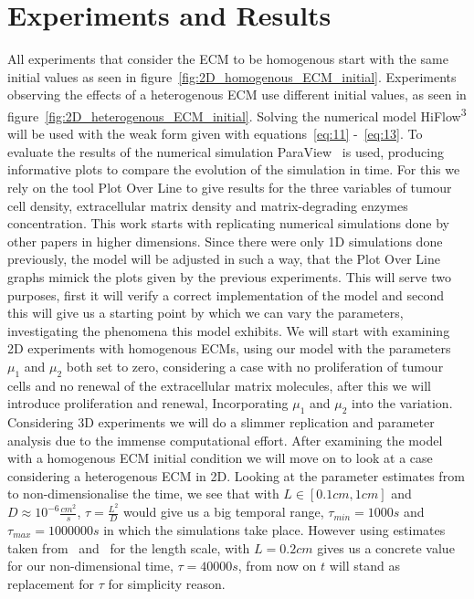 

\section{Experiments and Results}

All experiments that consider the ECM to be homogenous start with the same initial values as seen in figure~\ref{fig:2D_homogenous_ECM_initial}. Experiments observing the effects of a heterogenous ECM use different initial values, as seen in figure~\ref{fig:2D_heterogenous_ECM_initial}.\newline 
Solving the numerical model HiFlow\textsuperscript{3} will be used with the weak form given with equations~\ref{eq:11} -~\ref{eq:13}. To evaluate the results of the numerical simulation ParaView~\cite{paraview} is used, producing informative plots to compare the evolution of the simulation in time. For this we rely on the tool Plot Over Line to give results for the three variables of tumour cell density, extracellular matrix density and matrix-degrading enzymes concentration.\newline
This work starts with replicating numerical simulations done by other papers in higher dimensions. Since there were only 1D simulations done previously, the model will be adjusted in such a way, that the Plot Over Line graphs mimick the plots given by the previous experiments. This will serve two purposes, first it will verify a correct implementation of the model and second this will give us a starting point by which we can vary the parameters, investigating the phenomena this model exhibits. \newline 
We will start with examining 2D experiments with homogenous ECMs, using our model with the parameters $\mu_1$ and $\mu_2$ both set to zero, considering a case with no proliferation of tumour cells and no renewal of the extracellular matrix molecules, after this we will introduce proliferation and renewal, Incorporating $\mu_1$ and $\mu_2$ into the variation.
Considering 3D experiments we will do a slimmer replication and parameter analysis due to the immense computational effort. After examining the model with a homogenous ECM initial condition we will move on to look at a case considering a heterogenous ECM in 2D.\newline
Looking at the parameter estimates from \cite{anderson_mathematical_2000} to non-dimensionalise the time, we see that with $L \in [0.1cm,1cm]$ and $D\approx 10^{-6}\frac{cm^2}{s}$, $\tau = \frac{L^2}{D}$ would give us a big temporal range, $\tau_{min} = 1000s$ and $\tau_{max} = 1000000s$ in which the simulations take place. However using estimates taken from~\cite{STEPHANOU200696} and~\cite{franssen_mathematical_2019} for the length scale, with $L=0.2cm$ gives us a concrete value for our non-dimensional time, $\tau=40000s$, from now on $t$ will stand as replacement for $\tau$ for simplicity reason.\newline 
